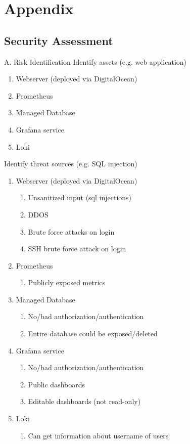 \newpage
\section{Appendix}

\subsection{Security Assessment}\label{appendix:securityAssessment}
A. Risk Identification
Identify assets (e.g. web application)
\begin{enumerate}
    \item Webserver (deployed via DigitalOcean)
    \item Prometheus
    \item Managed Database
    \item Grafana service
    \item Loki
\end{enumerate}
Identify threat sources (e.g. SQL injection)
\begin{enumerate}
    \item Webserver (deployed via DigitalOcean)
    \begin{enumerate}
        \item Unsanitized input (sql injections)
        \item DDOS 
        \item Brute force attacks on login
        \item SSH brute force attack on login
    \end{enumerate}
    \item Prometheus
    \begin{enumerate}
        \item Publicly exposed metrics
    \end{enumerate}
    \item Managed Database
    \begin{enumerate}
        \item No/bad authorization/authentication
        \item Entire database could be exposed/deleted
    \end{enumerate}
    \item Grafana service
    \begin{enumerate}
        \item No/bad authorization/authentication
        \item Public dashboards
        \item Editable dashboards (not read-only)
    \end{enumerate}
    \item Loki
    \begin{enumerate}
        \item Can get information about username of users
    \end{enumerate}
\end{enumerate}

